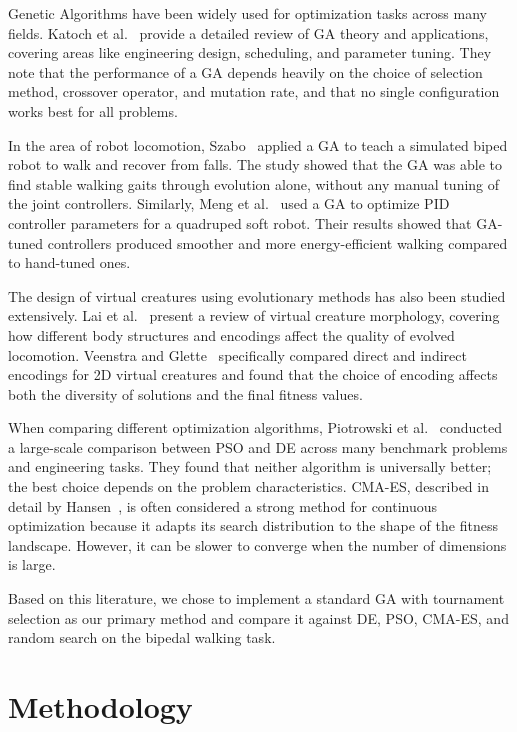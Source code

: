 \documentclass[11pt,a4paper]{article}
\begin{document}
Genetic Algorithms have been widely used for optimization tasks across many fields. Katoch et al.~\cite{katoch2021} provide a detailed review of GA theory and applications, covering areas like engineering design, scheduling, and parameter tuning. They note that the performance of a GA depends heavily on the choice of selection method, crossover operator, and mutation rate, and that no single configuration works best for all problems.

In the area of robot locomotion, Szabo~\cite{szabo2023} applied a GA to teach a simulated biped robot to walk and recover from falls. The study showed that the GA was able to find stable walking gaits through evolution alone, without any manual tuning of the joint controllers. Similarly, Meng et al.~\cite{meng2024} used a GA to optimize PID controller parameters for a quadruped soft robot. Their results showed that GA-tuned controllers produced smoother and more energy-efficient walking compared to hand-tuned ones.

The design of virtual creatures using evolutionary methods has also been studied extensively. Lai et al.~\cite{lai2021} present a review of virtual creature morphology, covering how different body structures and encodings affect the quality of evolved locomotion. Veenstra and Glette~\cite{veenstra2020} specifically compared direct and indirect encodings for 2D virtual creatures and found that the choice of encoding affects both the diversity of solutions and the final fitness values.

When comparing different optimization algorithms, Piotrowski et al.~\cite{piotrowski2023} conducted a large-scale comparison between PSO and DE across many benchmark problems and engineering tasks. They found that neither algorithm is universally better; the best choice depends on the problem characteristics. CMA-ES, described in detail by Hansen~\cite{hansen2016}, is often considered a strong method for continuous optimization because it adapts its search distribution to the shape of the fitness landscape. However, it can be slower to converge when the number of dimensions is large.

Based on this literature, we chose to implement a standard GA with tournament selection as our primary method and compare it against DE, PSO, CMA-ES, and random search on the bipedal walking task.

\section{Methodology}
\end{document}
